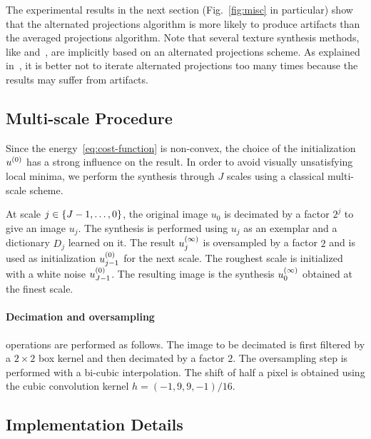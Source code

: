 The experimental results in the next section (Fig.~\ref{fig:misc} in particular) show that the alternated projections algorithm is more likely to produce artifacts than the averaged projections algorithm.
Note that several texture synthesis methods, like \cite{Heeger1995} and~\cite{simoncelli1992shiftable}, are implicitly based on an alternated projections scheme.
As explained in~\cite{Heeger1995}, it is better not to iterate alternated projections too many times because the results may suffer from artifacts.


\subsection{Multi-scale Procedure}
\label{sub:multi-scale}

Since the energy~\eqref{eq:cost-function} is non-convex, the choice of the initialization $u^{(0)}$ has a strong influence on the result.
In order to avoid visually unsatisfying local minima, we perform the synthesis through $J$ scales using a classical multi-scale scheme.

At scale $j\in\left\{J-1,\dots,0\right\}$, the original image $u_0$ is decimated by a factor $2^j$ to give an image $u_j$.
The synthesis is performed using $u_j$ as an exemplar and a dictionary $D_j$ learned on it.
The result $u^{(\infty)}_j$ is oversampled by a factor $2$ and is used as initialization $u^{(0)}_{j-1}$ for the next scale.
The roughest scale is initialized with a white noise $u^{(0)}_{J-1}$.
The resulting image is the synthesis $u^{(\infty)}_0$ obtained at the finest scale.


\paragraph{Decimation and oversampling} operations are performed as follows.
The image to be decimated is first filtered by a $2\times2$ box kernel and then decimated by a factor $2$.
The oversampling step is performed with a bi-cubic interpolation.
The shift of half a pixel is obtained using the cubic convolution kernel $h=(-1,9,9,-1) / 16$.


\subsection{Implementation Details}
\label{sub:implementation}


